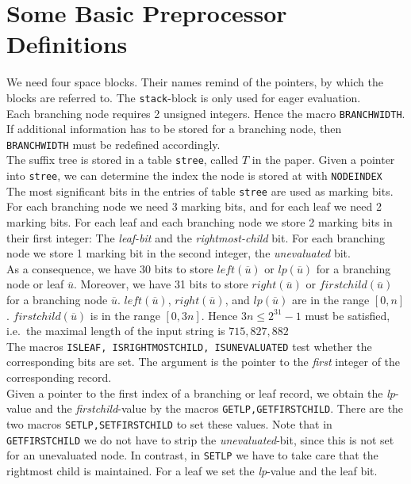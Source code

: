 \documentclass[a4paper]{article}
\begin{document}
\section{Some Basic Preprocessor Definitions}

We need four space blocks. Their names remind of the pointers, by which
the blocks are referred to. The \texttt{stack}-block is only used for
eager evaluation.\\

Each branching node requires 2 unsigned integers. Hence the macro
\texttt{BRANCHWIDTH}. If additional information has to be stored for a
branching node, then \texttt{BRANCHWIDTH} must be redefined accordingly.\\

The suffix tree is stored in a table \texttt{stree}, called \(T\) in the
paper. Given a pointer into \texttt{stree}, we can determine the index the
node is stored at with \texttt{NODEINDEX}\\

The most significant bits in the entries of table \texttt{stree} are used as
marking bits. For each branching node we need 3 marking bits, and for each leaf
we need 2 marking bits. For each leaf and each branching node we store 2
marking bits in their first integer: The \emph{leaf-bit} and the
\emph{rightmost-child} bit. For each branching node we store 1 marking bit in
the second integer, the \emph{unevaluated} bit.\\

As a consequence, we have 30 bits to store \(\mathit{left}(\overline{u})\) or
\(\mathit{lp}(\overline{u})\) for a branching node or leaf \(\overline{u}\).
Moreover, we have 31 bits to store \(\mathit{right}(\overline{u})\) or
\(\mathit{firstchild}(\overline{u})\) for a branching node \(\overline{u}\).
\(\mathit{left}(\overline{u})\), \(\mathit{right}(\overline{u})\), and
\(\mathit{lp}(\overline{u})\) are in the range \([0,n]\).
\(\mathit{firstchild}(\overline{u})\) is in the range \([0,3n]\). Hence
\(3n\leq 2^{31}-1\) must be satisfied, i.e.\ the maximal length of the input
string is \(715{,}827{,}882\)\\

The macros \texttt{ISLEAF, ISRIGHTMOSTCHILD, ISUNEVALUATED} test whether the
corresponding bits are set. The argument is the pointer to the \emph{first}
integer of the corresponding record.\\

Given a pointer to the first index of a branching or leaf record, we obtain the
\emph{lp}-value and the \emph{firstchild}-value by the macros
\texttt{GETLP,GETFIRSTCHILD}. There are the two macros
\texttt{SETLP,SETFIRSTCHILD} to set these values. Note that in
\texttt{GETFIRSTCHILD} we do not have to strip the \emph{unevaluated}-bit,
since this is not set for an unevaluated node. In contrast, in \texttt{SETLP}
we have to take care that the rightmost child is maintained. For a leaf we set
the \emph{lp}-value and the leaf bit.\\
\end{document}
